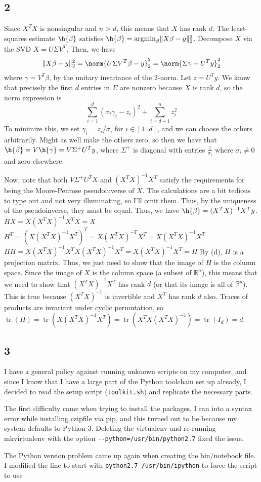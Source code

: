 \documentclass{article}
\DeclareMathOperator{\tr}{tr}
\newcommand{\rn}{\mathbb{R}}
\begin{document}
\subsection*{2}
Since $X^TX$ is nonsingular and $n>d$, this means that $X$ has rank $d$. The least-squares estimate $\h{\beta}$ satisfies $\h{\beta}=\text{argmin}_\beta\|X\beta-y\|_2^2$. Decompose $X$ via the SVD $X=U\Sigma V^T$. Then, we have 
\[\|X\beta-y\|_2^2=\norm{U\Sigma V^T\beta-y}_2^2=\norm{\Sigma \gamma-U^Ty}_2^2\]
where $\gamma=V^T\beta$, by the unitary invariance of the $2$-norm. Let $z=U^Ty$. We know that precisely the first $d$ entries in $\Sigma $ are nonzero because $X$ is rank $d$, so the norm expression is 
\[\sum_{i=1}^d(\sigma_i\gamma_i-z_i)^2+\sum_{i=d+1}^nz_i^2\]
To minimize this, we set $\gamma_i=z_i/\sigma_i$ for $i\in[1..d]$, and we can choose the others arbitrarily. Might as well make the others zero, so then we have that $\h{\beta}=V\h{\gamma}=V\Sigma^+U^Ty$, where $\Sigma^+$ is diagonal with entries $\frac{1}{\sigma_i}$ where $\sigma_i\neq0$ and zero elsewhere.

Now, note that both $V\Sigma^+U^TX$ and $(X^TX)^{-1}X^T$ satisfy the requirements for being the Moore-Penrose pseudoinverse of $X$. The calculations are a bit tedious to type out and not very illuminating, so I'll omit them. Thus, by the uniqueness of the pseudoinverse, they must be equal. Thus, we have $\h{\beta}=(X^TX)^{-1}X^Ty$.
$HX=X(X^TX)^{-1}X^TX=X$
$H^T=(X(X^TX)^{-1}X^T)^T=X(X^TX)^{-T}X^T=X(X^TX)^{-1}X^T$
$HH=X(X^TX)^{-1}X^TX(X^TX)^{-1}X^T=X(X^TX)^{-1}X^T=H$
By (d), $H$ is a projection matrix. Thus, we just need to show that the image of $H$ is the column space. Since the image of $X$ is the column space (a subset of $\rn^n$), this means that we need to show that $(X^TX)^{-1}X^T$ has rank $d$ (or that its image is all of $\rn^d$). This is true because $(X^TX)^{-1}$ is invertible and $X^T$ has rank $d$ also. 
Traces of products are invariant under cyclic permutation, so $\tr(H)=\tr(X(X^TX)^{-1}X^T)=\tr(X^TX(X^TX)^{-1})=\tr(I_d)=d$.
\subsection*{3}
I have a general policy against running unknown scripts on my computer, and since I know that I have a large part of the Python toolchain set up already, I decided to read the setup script (\verb|toolkit.sh|) and replicate the necessary parts. 

The first difficulty came when trying to install the packages. I ran into a syntax error while installing czipfile via pip, and this turned out to be because my system defaults to Python 3. Deleting the virtualenv and re-running mkvirtualenv with the option \verb|--python=/usr/bin/python2.7| fixed the issue.

The Python version problem came up again when creating the bin/notebook file. I modified the line to start with \verb|python2.7 /usr/bin/ipython| to force the script to use 
\end{document}
